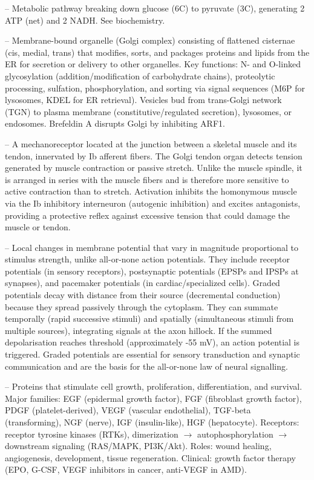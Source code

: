 -- Metabolic pathway breaking down glucose (6C) to pyruvate (3C), generating 2 ATP (net) and 2 NADH. See biochemistry.

-- Membrane-bound organelle (Golgi complex) consisting of flattened cisternae (cis, medial, trans) that modifies, sorts, and packages proteins and lipids from the ER for secretion or delivery to other organelles. Key functions: N- and O-linked glycosylation (addition/modification of carbohydrate chains), proteolytic processing, sulfation, phosphorylation, and sorting via signal sequences (M6P for lysosomes, KDEL for ER retrieval). Vesicles bud from trans-Golgi network (TGN) to plasma membrane (constitutive/regulated secretion), lysosomes, or endosomes. Brefeldin A disrupts Golgi by inhibiting ARF1.

-- A mechanoreceptor located at the junction between a skeletal muscle and its tendon, innervated by Ib afferent fibers. The Golgi tendon organ detects tension generated by muscle contraction or passive stretch. Unlike the muscle spindle, it is arranged in series with the muscle fibers and is therefore more sensitive to active contraction than to stretch. Activation inhibits the homonymous muscle via the Ib inhibitory interneuron (autogenic inhibition) and excites antagonists, providing a protective reflex against excessive tension that could damage the muscle or tendon.

-- Local changes in membrane potential that vary in magnitude proportional to stimulus strength, unlike all-or-none action potentials. They include receptor potentials (in sensory receptors), postsynaptic potentials (EPSPs and IPSPs at synapses), and pacemaker potentials (in cardiac/specialized cells). Graded potentials decay with distance from their source (decremental conduction) because they spread passively through the cytoplasm. They can summate temporally (rapid successive stimuli) and spatially (simultaneous stimuli from multiple sources), integrating signals at the axon hillock. If the summed depolarisation reaches threshold (approximately -55 mV), an action potential is triggered. Graded potentials are essential for sensory transduction and synaptic communication and are the basis for the all-or-none law of neural signalling.

-- Proteins that stimulate cell growth, proliferation, differentiation, and survival. Major families: EGF (epidermal growth factor), FGF (fibroblast growth factor), PDGF (platelet-derived), VEGF (vascular endothelial), TGF-beta (transforming), NGF (nerve), IGF (insulin-like), HGF (hepatocyte). Receptors: receptor tyrosine kinases (RTKs), dimerization $\rightarrow$ autophosphorylation $\rightarrow$ downstream signaling (RAS/MAPK, PI3K/Akt). Roles: wound healing, angiogenesis, development, tissue regeneration. Clinical: growth factor therapy (EPO, G-CSF, VEGF inhibitors in cancer, anti-VEGF in AMD).

